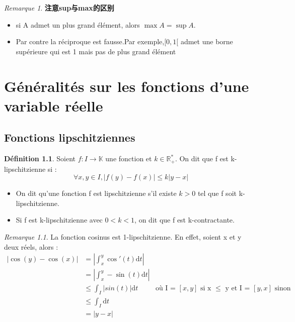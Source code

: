 \documentclass[12pt]{book}
\theoremstyle{definition}\newtheorem{dfn}{Définition}[chapter]
\theoremstyle{plain}\newtheorem{thm}{Théorème}[chapter]
\theoremstyle{plain}\newtheorem{prp}{Proposition}[chapter]
\theoremstyle{plain}\newtheorem{lem}{\bf Lemme}[chapter]
\theoremstyle{plain}\newtheorem{axm}{\bf Axiome}[chapter]
\theoremstyle{plain}\newtheorem{lmm}{\bf Lemme}[chapter]
\theoremstyle{plain}\newtheorem{exm}{\bf Example}[chapter]
\theoremstyle{plain}\newtheorem{cor}{\bf Corollaire}[chapter]
\theoremstyle{remark}\newtheorem{rem}{Remarque}[chapter]
\begin{document}
\begin{rem}
\textbf{注意sup与max的区别}
\begin{itemize}
\item si A admet un plus grand élément, alors $\max A=\sup A$.
\item Par contre la réciproque est fausse.Par exemple,$[0,1[$ admet une borne supérieure qui est 1 mais pas de plus grand élément
\end{itemize}
\end{rem}



\chapter{Généralités sur les fonctions d'une variable réelle}


\section{Fonctions lipschitziennes}



\begin{dfn}
Soient $f : I \rightarrow \mathbb{K}$ une fonction et $k \in \mathbb{R_{+}^{*}}$. On dit que f est k-lipschitzienne si :
$$\forall x,y \in I ,\left |   f(y)- f(x)\right | \le k \left |   y- x\right |
$$
\begin{itemize}

\item On dit qu'une fonction f est lipschitzienne s'il existe $k > 0$ tel que f soit k-lipschitzienne.
\item Si f est k-lipschitzienne avec $0 < k < 1$, on dit que f est k-{\color{red}contractante}.

\end{itemize}


\end{dfn}

\begin{rem}
La fonction cosinus est 1-lipschitzienne. En effet, soient x et y deux réels, alors :
$$
\begin{aligned}
\left|   \cos(y)-\cos(x)   \right| &=\left|\int_{x}^{y}\cos'(t)\mathrm{d}t \right|\\
&=\left|\int_{x}^{y}-\sin(t)\mathrm{d}t \right|\\
&\le\int_{I}\left|sin(t)\right|\mathrm{d}t&\text{où I = $\left[x, y\right]$ si x $\le$ y et I = $\left[y, x\right]$ sinon}\\
&\le\int_{I}\mathrm{d}t\\
&=\left| y-x \right|\\
\end{aligned}
$$
\end{rem}
\end{document}
